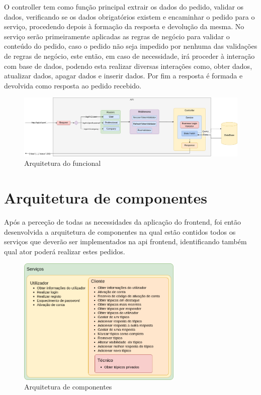 O controller tem como função principal extrair os dados do pedido, validar os dados, verificando 
se os dados obrigatórios existem e encaminhar o pedido para o serviço, procedendo depois à formação 
da resposta e devolução da mesma. No serviço serão primeiramente aplicadas as regras de negócio para 
validar o conteúdo do pedido, caso o pedido não seja impedido por nenhuma das validações de 
regras de negócio, este então, em caso de necessidade, irá proceder à interação com base de dados, 
podendo esta realizar diversas interações como, obter dados, atualizar dados, apagar dados e inserir 
dados. Por fim a resposta é formada e devolvida como resposta ao pedido recebido.

\begin{figure}[htb]
    \centering
    \includegraphics[width=\textwidth]{images/Arquiteturas/arquitetura_funcional.png}
    \caption{Arquitetura do funcional}
    \label{fig:3}
\end{figure}

\newpage

\section{Arquitetura de componentes}
Após a perceção de todas as necessidades da aplicação do frontend, foi então desenvolvida a 
arquitetura de componentes na qual estão contidos todos os serviços que deverão ser implementados na 
api frontend, identificando também qual ator poderá realizar estes pedidos.

\begin{figure}[htb]
    \centering
    \includegraphics[width=0.7\textwidth]{images/Arquiteturas/arquitetura_de_componentes_final.png}
    \caption{Arquitetura de componentes}
    \label{fig:4}
\end{figure}

